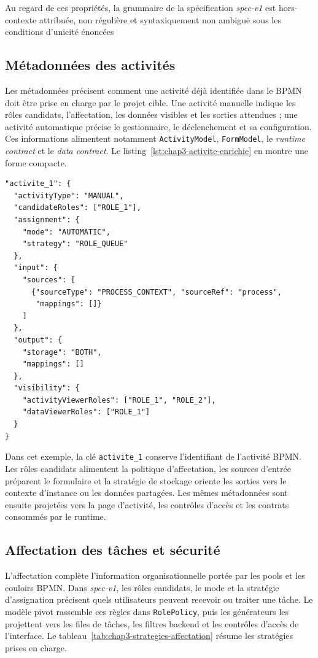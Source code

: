 Au regard de ces propriétés, la grammaire de la spécification \textit{spec-v1} est hors-contexte attribuée, non régulière et syntaxiquement non ambiguë sous les conditions d’unicité énoncées

\subsection{Métadonnées des activités}

Les métadonnées précisent comment une activité déjà identifiée dans le BPMN doit
être prise en charge par le projet cible. Une activité manuelle indique les rôles
candidats, l'affectation, les données visibles et les sorties attendues ; une
activité automatique précise le gestionnaire, le déclenchement et sa
configuration. Ces informations alimentent notamment \texttt{ActivityModel},
\texttt{FormModel}, le \textit{runtime contract} et le \textit{data contract}. Le
listing~\ref{lst:chap3-activite-enrichie} en montre une forme compacte.

\begin{lstlisting}[caption={Activité enrichie dans spec-v1},label={lst:chap3-activite-enrichie}]
"activite_1": {
  "activityType": "MANUAL",
  "candidateRoles": ["ROLE_1"],
  "assignment": {
    "mode": "AUTOMATIC",
    "strategy": "ROLE_QUEUE"
  },
  "input": {
    "sources": [
      {"sourceType": "PROCESS_CONTEXT", "sourceRef": "process",
       "mappings": []}
    ]
  },
  "output": {
    "storage": "BOTH",
    "mappings": []
  },
  "visibility": {
    "activityViewerRoles": ["ROLE_1", "ROLE_2"],
    "dataViewerRoles": ["ROLE_1"]
  }
}
\end{lstlisting}

Dans cet exemple, la clé \texttt{activite\_1} conserve l'identifiant de l'activité
BPMN. Les rôles candidats alimentent la politique d'affectation, les sources
d'entrée préparent le formulaire et la stratégie de stockage oriente les sorties
vers le contexte d'instance ou les données partagées. Les mêmes métadonnées sont
ensuite projetées vers la page d'activité, les contrôles d'accès et les contrats
consommés par le runtime.

\subsection{Affectation des tâches et sécurité}

L'affectation complète l'information organisationnelle portée par les pools et
les couloirs BPMN. Dans \textit{spec-v1}, les rôles candidats, le mode et la
stratégie d'assignation précisent quels utilisateurs peuvent recevoir ou traiter
une tâche. Le modèle pivot rassemble ces règles dans \texttt{RolePolicy}, puis
les générateurs les projettent vers les files de tâches, les filtres backend et
les contrôles d'accès de l'interface. Le tableau~\ref{tab:chap3-strategies-affectation}
résume les stratégies prises en charge.

